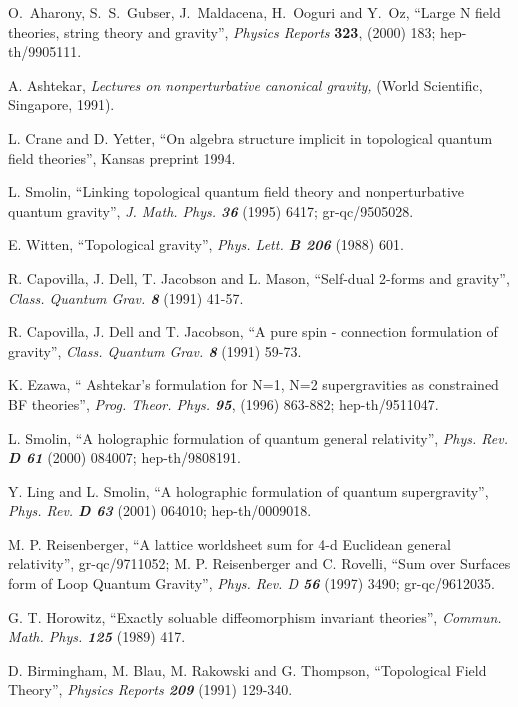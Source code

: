 \documentclass[a4paper,twocolumn,showpacs,prd]{revtex4}
\begin{document}
\begin{thebibliography}{}

O.~Aharony, S.~S.~Gubser, J.~Maldacena, H.~Ooguri and Y.~Oz,
``Large N field theories, string theory and gravity'', {\it
Physics Reports}  {\bf 323}, (2000) 183; hep-th/9905111.

A. Ashtekar, {\it Lectures on nonperturbative canonical gravity,}
 (World Scientific, Singapore, 1991).

L. Crane and D. Yetter, ``On algebra structure implicit in
topological quantum field theories'', Kansas preprint 1994.

L. Smolin, ``Linking topological quantum field theory and
nonperturbative quantum gravity'', {\em J. Math. Phys. \bf 36 }
(1995) 6417; gr-qc/9505028.

 E. Witten, ``Topological gravity'',
 {\it Phys. Lett. \bf B 206}
  (1988) 601.

R. Capovilla, J. Dell, T. Jacobson and L. Mason, ``Self-dual
2-forms and gravity'', {\it Class. Quantum Grav. \bf 8} (1991)
41-57.

R. Capovilla, J. Dell and T. Jacobson, ``A pure spin - connection
formulation of gravity'', {\it Class. Quantum Grav. \bf 8} (1991)
59-73.

 K. Ezawa, ``
Ashtekar's formulation for N=1, N=2 supergravities as constrained
BF theories'',  {\it Prog. Theor. Phys. \bf 95}, (1996) 863-882;
hep-th/9511047.

L. Smolin, ``A holographic formulation of quantum general
relativity'',  {\it Phys. Rev. \bf D 61} (2000) 084007;
hep-th/9808191.

Y. Ling and L. Smolin, ``A holographic formulation of quantum
 supergravity'',  {\it Phys. Rev. \bf D 63}
(2001) 064010; hep-th/0009018.

M. P. Reisenberger,
``A lattice worldsheet sum for 4-d Euclidean general relativity'',
gr-qc/9711052; M. P. Reisenberger and C. Rovelli, ``Sum over
Surfaces form of Loop Quantum Gravity'', {\it Phys. Rev. D \bf 56}
(1997) 3490; gr-qc/9612035.

G. T. Horowitz, ``Exactly soluable diffeomorphism invariant
theories'', {\it Commun. Math. Phys. \bf 125} (1989) 417.

D. Birmingham, M. Blau, M. Rakowski and G. Thompson, ``Topological
Field Theory'', {\it Physics Reports \bf 209} (1991) 129-340.



\end{thebibliography}
\end{document}
